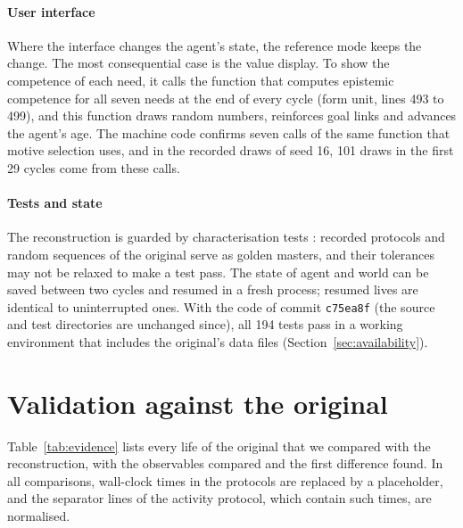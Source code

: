 \documentclass[preprint,12pt,authoryear]{elsarticle}
\newcommand{\code}[1]{\texttt{#1}}
\begin{document}
\paragraph{User interface} Where the interface changes the agent's state, the reference mode keeps the change. The most consequential case is the value display. To show the competence of each need, it calls the function that computes epistemic competence for all seven needs at the end of every cycle (form unit, lines 493 to 499), and this function draws random numbers, reinforces goal links and advances the agent's age. The machine code confirms seven calls of the same function that motive selection uses, and in the recorded draws of seed 16, 101 draws in the first 29 cycles come from these calls.

\paragraph{Tests and state} The reconstruction is guarded by characterisation tests \citep{feathers2004working}: recorded protocols and random sequences of the original serve as golden masters, and their tolerances may not be relaxed to make a test pass. The state of agent and world can be saved between two cycles and resumed in a fresh process; resumed lives are identical to uninterrupted ones. With the code of commit \code{c75ea8f} (the source and test directories are unchanged since), all 194 tests pass in a working environment that includes the original's data files (Section~\ref{sec:availability}).

\section{Validation against the original}

Table~\ref{tab:evidence} lists every life of the original that we compared with the reconstruction, with the observables compared and the first difference found. In all comparisons, wall-clock times in the protocols are replaced by a placeholder, and the separator lines of the activity protocol, which contain such times, are normalised.
\end{document}
